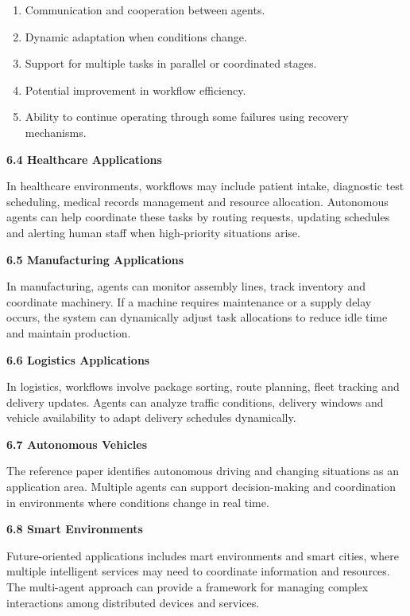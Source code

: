 \documentclass[12pt,letterpaper]{article}
\newcommand{\sectiontitle}[1]{%
  \vspace{6pt}%
  {\noindent\fontsize{13.2pt}{16pt}\selectfont\bfseries #1\par}%
  \vspace{2pt}%
}
\newcommand{\bodytextstyle}{\fontsize{11.3pt}{25.8pt}\selectfont}
\begin{document}
\bodytextstyle
\begin{enumerate}[leftmargin=20pt, label=\arabic*., itemsep=3pt, parsep=0pt, topsep=0pt, start=3]
\item Communication and cooperation between agents.
\item Dynamic adaptation when conditions change.
\item Support for multiple tasks in parallel or coordinated stages.
\item Potential improvement in workflow efficiency.
\item Ability to continue operating through some failures using recovery mechanisms.
\end{enumerate}

\sectiontitle{6.4 Healthcare Applications}
In healthcare environments, workflows may include patient intake, diagnostic test scheduling, medical records management and resource allocation. Autonomous agents can help coordinate these tasks by routing requests, updating schedules and alerting human staff when high-priority situations arise.

\sectiontitle{6.5 Manufacturing Applications}
In manufacturing, agents can monitor assembly lines, track inventory and coordinate machinery. If a machine requires maintenance or a supply delay occurs, the system can dynamically adjust task allocations to reduce idle time and maintain production.

\sectiontitle{6.6 Logistics Applications}
In logistics, workflows involve package sorting, route planning, fleet tracking and delivery updates. Agents can analyze traffic conditions, delivery windows and vehicle availability to adapt delivery schedules dynamically.

\sectiontitle{6.7 Autonomous Vehicles}
The reference paper identifies autonomous driving and changing situations as an application area. Multiple agents can support decision-making and coordination in environments where conditions change in real time.
\newpage

\bodytextstyle
\sectiontitle{6.8 Smart Environments}
Future-oriented applications includes mart environments and smart cities, where multiple intelligent services may need to coordinate information and resources. The multi-agent approach can provide a framework for managing complex interactions among distributed devices and services.
\end{document}

